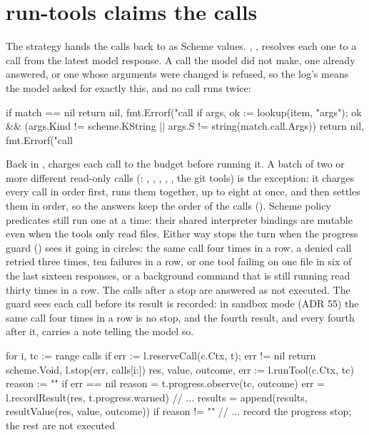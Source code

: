 \section{run-tools claims the calls}

The strategy hands the calls back to  as Scheme values.
, , resolves each one to a call
from the latest model response. A call the model did not make, one already
answered, or one whose arguments were changed is refused, so the log's
 means the model asked for exactly this, and no call
runs twice:

\begin{go}
if match == nil {
    return nil, fmt.Errorf("call %
}
if args, ok := lookup(item, "args"); ok && (args.Kind != scheme.KString || args.S != string(match.call.Args)) {
    return nil, fmt.Errorf("call %
}
\end{go}

Back in ,  charges each call to the budget
before running it. A batch of two or more different read-only calls
(: , , ,
, , the git tools) is the exception: it
charges every call in order first, runs them together, up to eight at once,
and then settles them in order, so the answers keep the order of the calls
(). Scheme policy predicates still run one at a time: their shared
interpreter bindings are mutable even when the tools only read files.
Either way  stops the turn when the progress guard
() sees it going in circles: the same call four times in a
row, a denied call retried three times, ten failures in a row, or one tool
failing on one file in six of the last sixteen responses, or a background
command that is still running read thirty times in a row. The calls
after a stop are answered as not executed. The guard sees each call before
its result is recorded: in sandbox mode (ADR 55) the same call four times in
a row is no stop, and the fourth result, and every fourth after it, carries a
note telling the model so.

\begin{go}
for i, tc := range calls {
    if err := l.reserveCall(c.Ctx, t); err != nil {
        return scheme.Void, l.stop(err, calls[i:])
    }
    res, value, outcome, err := l.runTool(c.Ctx, tc)
    reason := ""
    if err == nil {
        reason = t.progress.observe(tc, outcome)
        err = l.recordResult(res, t.progress.warned)
    }
    // ...
    results = append(results, resultValue(res, value, outcome))
    if reason != "" {
        // ... record the progress stop; the rest are not executed
    }
}
\end{go}

